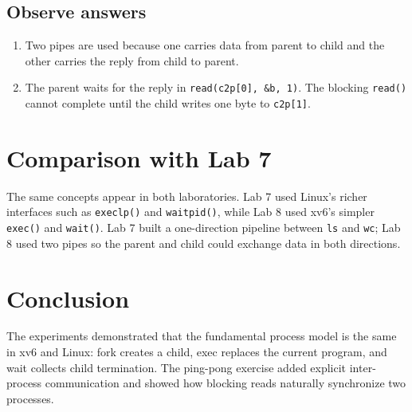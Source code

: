 \documentclass[12pt,a4paper]{article}
\begin{document}
\subsection{Observe answers}
\begin{enumerate}[label=\arabic*.]
\item Two pipes are used because one carries data from parent to child and the other carries the reply from child to parent.
\item The parent waits for the reply in \texttt{read(c2p[0], \&b, 1)}. The blocking \texttt{read()} cannot complete until the child writes one byte to \texttt{c2p[1]}.
\end{enumerate}

\section{Comparison with Lab 7}
The same concepts appear in both laboratories. Lab 7 used Linux's richer interfaces such as \texttt{execlp()} and \texttt{waitpid()}, while Lab 8 used xv6's simpler \texttt{exec()} and \texttt{wait()}. Lab 7 built a one-direction pipeline between \texttt{ls} and \texttt{wc}; Lab 8 used two pipes so the parent and child could exchange data in both directions.

\section{Conclusion}
The experiments demonstrated that the fundamental process model is the same in xv6 and Linux: fork creates a child, exec replaces the current program, and wait collects child termination. The ping-pong exercise added explicit inter-process communication and showed how blocking reads naturally synchronize two processes.
\end{document}
